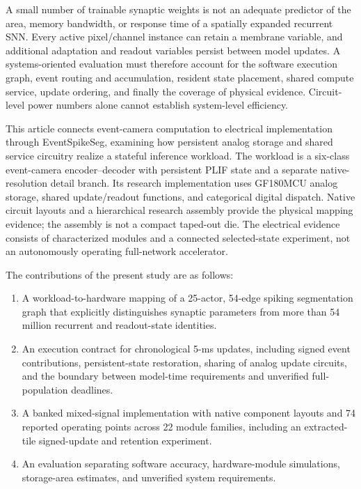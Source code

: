 \documentclass[preprint,12pt,number]{elsarticle}
\begin{document}
A small number of trainable synaptic weights is not an adequate predictor of the area, memory bandwidth, or response time of a spatially expanded recurrent SNN. Every active pixel/channel instance can retain a membrane variable, and additional adaptation and readout variables persist between model updates. A systems-oriented evaluation must therefore account for the software execution graph, event routing and accumulation, resident state placement, shared compute service, update ordering, and finally the coverage of physical evidence. Circuit-level power numbers alone cannot establish system-level efficiency.

This article connects event-camera computation to electrical implementation through EventSpikeSeg, examining how persistent analog storage and shared service circuitry realize a stateful inference workload. The workload is a six-class event-camera encoder--decoder with persistent PLIF state and a separate native-resolution detail branch. Its research implementation uses GF180MCU analog storage, shared update/readout functions, and categorical digital dispatch. Native circuit layouts and a hierarchical research assembly provide the physical mapping evidence; the assembly is not a compact taped-out die. The electrical evidence consists of characterized modules and a connected selected-state experiment, not an autonomously operating full-network accelerator.

The contributions of the present study are as follows:
\begin{enumerate}
\item A workload-to-hardware mapping of a 25-actor, 54-edge spiking segmentation graph that explicitly distinguishes synaptic parameters from more than 54 million recurrent and readout-state identities.
\item An execution contract for chronological 5-ms updates, including signed event contributions, persistent-state restoration, sharing of analog update circuits, and the boundary between model-time requirements and unverified full-population deadlines.
\item A banked mixed-signal implementation with native component layouts and 74 reported operating points across 22 module families, including an extracted-tile signed-update and retention experiment.
\item An evaluation separating software accuracy, hardware-module simulations, storage-area estimates, and unverified system requirements.
\end{enumerate}
\end{document}
